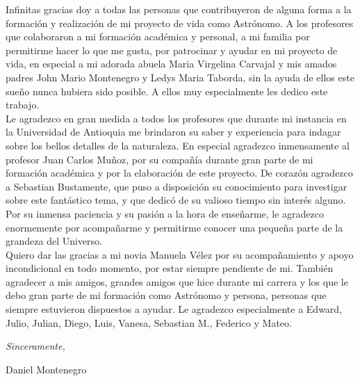 \begin{acknowledgements}      

Infinitas gracias doy a todas las personas que contribuyeron de alguna forma a la formación y realización de mi proyecto de vida como Astrónomo. A los profesores que colaboraron a mi formación académica y personal, a mi familia por permitirme hacer lo que me gusta, por patrocinar y ayudar en mi proyecto de vida, en especial a mi adorada abuela Maria Virgelina Carvajal y mis amados padres  John Mario Montenegro y Ledys Maria Taborda, sin la ayuda de ellos este sueño nunca hubiera sido posible. A ellos muy especialmente les dedico este trabajo. \\

Le agradezco en gran medida a todos los profesores que durante mi instancia en la Universidad de Antioquia me brindaron su saber y experiencia para indagar sobre los bellos detalles de la naturaleza. En especial agradezco inmensamente al profesor Juan Carlos Mu\~noz, por su compañía durante gran parte de mi formación académica y por la elaboración de este proyecto. De corazón agradezco a Sebastian Bustamente, que puso a disposición su conocimiento para investigar sobre este fantástico tema, y que dedicó de su valioso tiempo sin interés alguno. Por su inmensa paciencia y su pasión a la hora de enseñarme, le agradezco enormemente por acompañarme y permitirme conocer una pequeña parte de la grandeza del Universo. \\

Quiero dar las gracias a mi novia Manuela Vélez por su acompañamiento y apoyo incondicional en todo momento, por estar siempre pendiente de mi. También agradecer a mis amigos, grandes amigos que hice durante mi carrera y los que le debo gran parte de mi formación como Astrónomo y persona, personas que siempre estuvieron dispuestos a ayudar. Le agradezco especialmente a Edward, Julio, Julian, Diego, Luis, Vanesa, Sebastian M., Federico y Mateo. 
 


\begin{flushright}
\textit{Sinceramente,}


Daniel Montenegro


\monthname \ \the\year
\end{flushright}


\end{acknowledgements}

